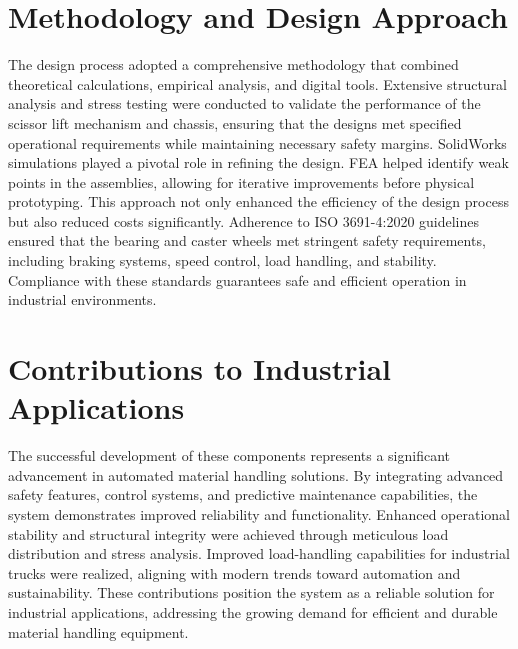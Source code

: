 \documentclass[main]{subfiles}
\begin{document}
\section{Methodology and Design Approach}
The design process adopted a comprehensive methodology that combined theoretical calculations, empirical analysis, and digital tools. Extensive structural analysis and stress testing were conducted to validate the performance of the scissor lift mechanism and chassis, ensuring that the designs met specified operational requirements while maintaining necessary safety margins. SolidWorks simulations played a pivotal role in refining the design. FEA helped identify weak points in the assemblies, allowing for iterative improvements before physical prototyping. This approach not only enhanced the efficiency of the design process but also reduced costs significantly. Adherence to ISO 3691-4:2020 guidelines ensured that the bearing and caster wheels met stringent safety requirements, including braking systems, speed control, load handling, and stability. Compliance with these standards guarantees safe and efficient operation in industrial environments.

\section{Contributions to Industrial Applications}
The successful development of these components represents a significant advancement in automated material handling solutions. By integrating advanced safety features, control systems, and predictive maintenance capabilities, the system demonstrates improved reliability and functionality. Enhanced operational stability and structural integrity were achieved through meticulous load distribution and stress analysis. Improved load-handling capabilities for industrial trucks were realized, aligning with modern trends toward automation and sustainability. These contributions position the system as a reliable solution for industrial applications, addressing the growing demand for efficient and durable material handling equipment.
\end{document}
